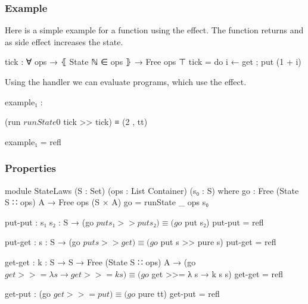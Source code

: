 

\subsubsection{Example}

Here is a simple example for a function using the 
effect.
The function  returns  and
as side effect increases the state.

\begin{code}
tick : ∀ {ops} → ⦃ State ℕ ∈ ops ⦄ → Free ops ⊤
tick = do i ← get ; put (1 + i)
\end{code}
Using the  handler we can evaluate programs, which use
the  effect.

\begin{center}
\begin{code}
example₁ :
\end{code}
\begin{code}[inline]
 (run $ runState 0 $ tick >> tick) ≡ (2 , tt)
\end{code}
\begin{code}
example₁ = refl
\end{code}
\end{center}

\subsubsection{Properties}

\begin{code}
module StateLaws (S : Set) (ops : List Container) (s₀ : S) where
  go : Free (State S ∷ ops) A → Free ops (S × A)
  go = runState {_} {ops} s₀

  put-put : {s₁ s₂ : S} → (go $ put s₁ >> put s₂) ≡ (go $ put s₂)
  put-put = refl

  put-get : {s : S} → (go $ put s >> get) ≡ (go $ put s >> pure s)
  put-get = refl

  get-get : {k : S → S → Free (State S ∷ ops) A}
    → (go $ get >>= λ s → get >>= k s) ≡ (go $ get >>= λ s → k s s)
  get-get = refl

  get-put : (go $ get >>= put) ≡ (go $ pure tt)
  get-put = refl
\end{code}


